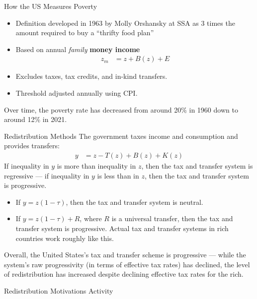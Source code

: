 \documentclass[8pt]{extarticle}
\begin{document}
  \begin{problem}{How the US Measures Poverty}
    \begin{itemize}
      \item Definition developed in 1963 by Molly Orshansky at SSA as 3 times the amount required to buy a ``thrifty food plan''
      \item Based on annual \textit{family} \textbf{money income}
        \begin{align*}
          z_{m} &= z + B(z) + E
        \end{align*}
      \item Excludes taxes, tax credits, and in-kind transfers.
      \item Threshold adjusted annually using CPI.
    \end{itemize}
    Over time, the poverty rate has decreased from around 20\% in 1960 down to around 12\% in 2021.
  \end{problem}
  \begin{problem}{Redistribution Methods}
    The government taxes income and consumption and provides transfers:
    \begin{align*}
      y &= z - T(z) + B(z) + K(z)
    \end{align*}
    If inequality in $y$ is more than inequality in $z$, then the tax and transfer system is regressive --- if inequality in $y$ is less than in $z$, then the tax and transfer system is progressive.
    \begin{itemize}
      \item If $y = z(1-\tau)$, then the tax and transfer system is neutral.
      \item If $y = z(1-\tau) + R$, where $R$ is a universal transfer, then the tax and transfer system is progressive. Actual tax and transfer systems in rich countries work roughly like this.
    \end{itemize}
    Overall, the United States's tax and transfer scheme is progressive --- while the system's raw progressivity (in terms of effective tax rates) has declined, the level of redistribution has increased despite declining effective tax rates for the rich.
  \end{problem}
  \begin{problem}{Redistribution Motivations Activity}
    \begin{tcbraster}[raster columns = 1,colframe = black!75!white,colback=white]
    \end{tcbraster}
  \end{problem}
\end{document}
